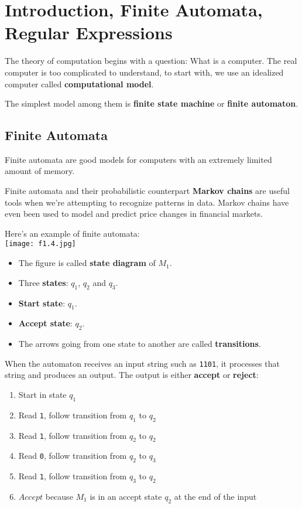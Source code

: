 \chapter{Introduction, Finite Automata, Regular Expressions}

The theory of computation begins with a question: What is a computer. The real computer is too complicated to understand, to start with, we use an idealized computer called \textbf{computational model}. 

The simplest model among them is \textbf{finite state machine} or \textbf{finite automaton}.  

\section{Finite Automata}

Finite automata are good models for computers with an extremely limited amount of memory. 

Finite automata and their probabilistic counterpart \textbf{Markov chains} are useful tools when we're attempting to recognize patterns in data. Markov chains have even been used to model and predict price changes in financial markets.

\begin{eg}
    Here's an example of finite automata:\\
    \texttt{[image: f1.4.jpg]}

    \begin{itemize}
        \item The figure is called \textbf{state diagram} of \(M_1\).
        \item Three \textbf{states}: \(q_1\), \(q_2\) and \(q_3\).
        \item \textbf{Start state}: \(q_1\).   
        \item \textbf{Accept state}: \(q_2\).  
        \item The arrows going from one state to another are called \textbf{transitions}.
    \end{itemize}

    When the automaton receives an input string such as \verb|1101|, it processes that string and produces an output. The output is either \textbf{accept} or \textbf{reject}:
    \begin{enumerate}
        \item Start in state \(q_1\) 
        \item Read \verb|1|, follow transition from \(q_1\) to \(q_2\)  
        \item Read \verb|1|, follow transition from \(q_2\) to \(q_2\)  
        \item Read \verb|0|, follow transition from \(q_2\) to \(q_3\)  
        \item Read \verb|1|, follow transition from \(q_3\) to \(q_2\)  
        \item \(Accept\) because \(M_1\) is in an accept state \(q_2\) at the end of the input   
    \end{enumerate}
\end{eg}

